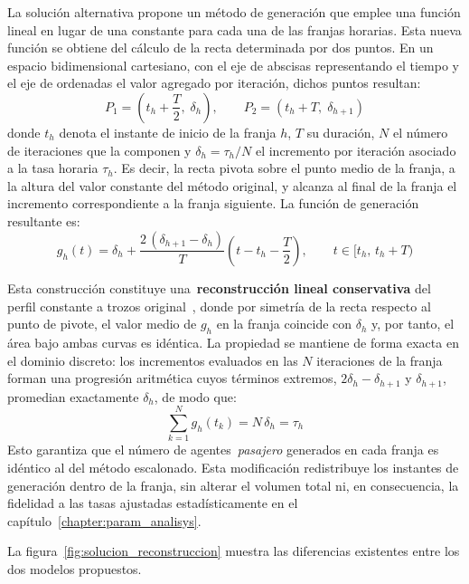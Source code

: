La solución alternativa propone un método de generación que emplee una función
lineal en lugar de una constante para cada una de las franjas horarias. Esta
nueva función se obtiene del cálculo de la recta determinada por dos puntos. En
un espacio bidimensional cartesiano, con el eje de abscisas representando el
tiempo y el eje de ordenadas el valor agregado por iteración, dichos puntos
resultan:
\begin{equation}
    P_1 = \left(t_h + \frac{T}{2},\; \delta_h\right), \qquad
    P_2 = \left(t_h + T,\; \delta_{h+1}\right)
    \label{eq:puntos_tendencia}
\end{equation}
donde $t_h$ denota el instante de inicio de la franja $h$, $T$ su duración,
$N$ el número de iteraciones que la componen y $\delta_h = \tau_h / N$ el
incremento por iteración asociado a la tasa horaria $\tau_h$. Es decir, la
recta pivota sobre el punto medio de la franja, a la altura del valor constante
del método original, y alcanza al final de la franja el incremento
correspondiente a la franja siguiente. La función de generación resultante es:
\begin{equation}
    g_h(t) = \delta_h + \frac{2\,(\delta_{h+1} - \delta_h)}{T}
             \left(t - t_h - \frac{T}{2}\right),
    \qquad t \in [t_h,\, t_h + T)
    \label{eq:recta_tendencia}
\end{equation}

Esta construcción constituye una~\textbf{reconstrucción lineal conservativa} del perfil
constante a trozos original~\cite{boneva1971}, donde por simetría de la recta
respecto al punto de pivote, el valor medio de $g_h$ en la franja coincide con
$\delta_h$ y, por tanto, el área bajo ambas curvas es idéntica. La propiedad se
mantiene de forma exacta en el dominio discreto: los incrementos evaluados en
las $N$ iteraciones de la franja forman una progresión aritmética cuyos
términos extremos, $2\delta_h - \delta_{h+1}$ y $\delta_{h+1}$, promedian
exactamente $\delta_h$, de modo que:
\begin{equation}
    \sum_{k=1}^{N} g_h(t_k) = N\,\delta_h = \tau_h
    \label{eq:conservacion}
\end{equation}
Esto garantiza que el número de agentes~\textit{pasajero} generados en cada
franja es idéntico al del método escalonado. Esta modificación redistribuye los
instantes de generación dentro de la franja, sin alterar el volumen total ni,
en consecuencia, la fidelidad a las tasas ajustadas estadísticamente en el
capítulo~\ref{chapter:param_analisys}.

La figura~\ref{fig:solucion_reconstruccion} muestra las diferencias existentes entre los dos modelos propuestos.


